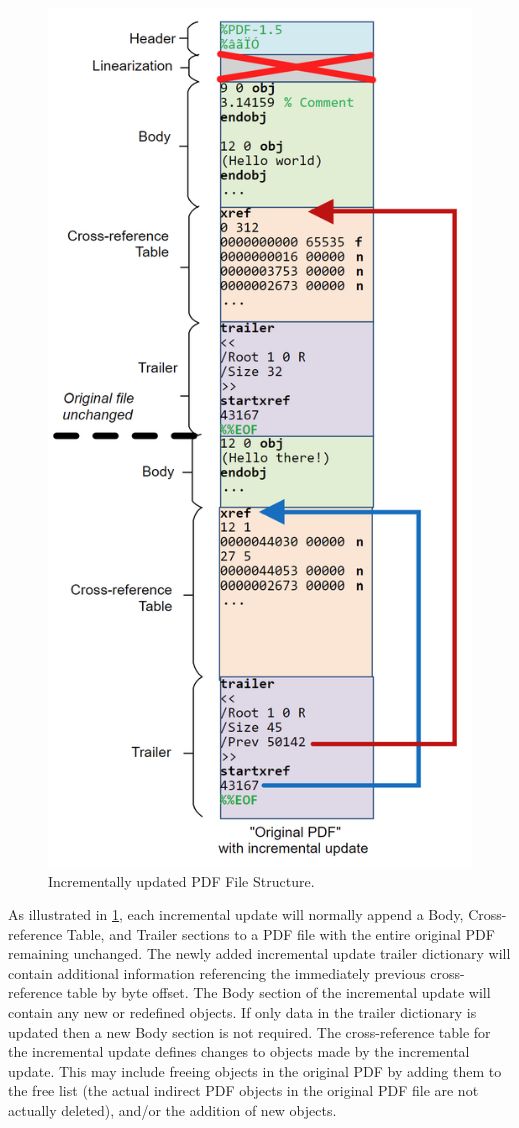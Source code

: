 \begin{figure}[t]
    \centering
    \includegraphics[width=0.65\linewidth]{figures/pdf-structure-incremental.png}
    \caption{Incrementally updated PDF File Structure.}
    \label{fig:pdf-structure-incremental}
\end{figure}

As illustrated in \cref{fig:pdf-structure-incremental}, each incremental update will 
normally append a Body, Cross-reference Table, and Trailer sections
to a PDF file with the entire original PDF remaining unchanged. The newly added incremental
update trailer dictionary will contain additional information referencing the immediately 
previous cross-reference table by byte offset. The Body section of the incremental update 
will contain any new or redefined objects. If only data in the trailer dictionary is updated then
a new Body section is not required. The cross-reference table for the incremental update
defines changes to objects made by the incremental update. This may include freeing
objects in the original PDF by adding them to the free list (the actual indirect PDF objects in
the original PDF file are not actually deleted), and/or the addition of new objects. 

